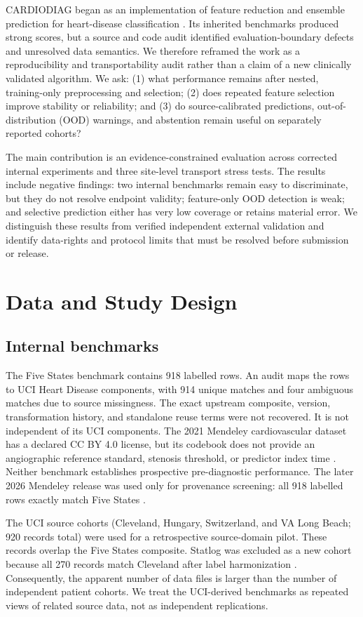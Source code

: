\documentclass[conference]{IEEEtran}
\begin{document}
CARDIODIAG began as an implementation of feature reduction and ensemble prediction for heart-disease classification \cite{khan2026cardiodiag}. Its inherited benchmarks produced strong scores, but a source and code audit identified evaluation-boundary defects and unresolved data semantics. We therefore reframed the work as a reproducibility and transportability audit rather than a claim of a new clinically validated algorithm. We ask: (1) what performance remains after nested, training-only preprocessing and selection; (2) does repeated feature selection improve stability or reliability; and (3) do source-calibrated predictions, out-of-distribution (OOD) warnings, and abstention remain useful on separately reported cohorts?

The main contribution is an evidence-constrained evaluation across corrected internal experiments and three site-level transport stress tests. The results include negative findings: two internal benchmarks remain easy to discriminate, but they do not resolve endpoint validity; feature-only OOD detection is weak; and selective prediction either has very low coverage or retains material error. We distinguish these results from verified independent external validation and identify data-rights and protocol limits that must be resolved before submission or release.

\section{Data and Study Design}
\subsection{Internal benchmarks}
The Five States benchmark contains 918 labelled rows. An audit maps the rows to UCI Heart Disease components, with 914 unique matches and four ambiguous matches due to source missingness. The exact upstream composite, version, transformation history, and standalone reuse terms were not recovered. It is not independent of its UCI components. The 2021 Mendeley cardiovascular dataset has a declared CC BY 4.0 license, but its codebook does not provide an angiographic reference standard, stenosis threshold, or predictor index time \cite{doppala2021dataset}. Neither benchmark establishes prospective pre-diagnostic performance. The later 2026 Mendeley release was used only for provenance screening: all 918 labelled rows exactly match Five States \cite{mendeleyheart2026}.

The UCI source cohorts (Cleveland, Hungary, Switzerland, and VA Long Beach; 920 records total) were used for a retrospective source-domain pilot. These records overlap the Five States composite. Statlog was excluded as a new cohort because all 270 records match Cleveland after label harmonization \cite{ucihd,ucistatlog}. Consequently, the apparent number of data files is larger than the number of independent patient cohorts. We treat the UCI-derived benchmarks as repeated views of related source data, not as independent replications.
\end{document}
